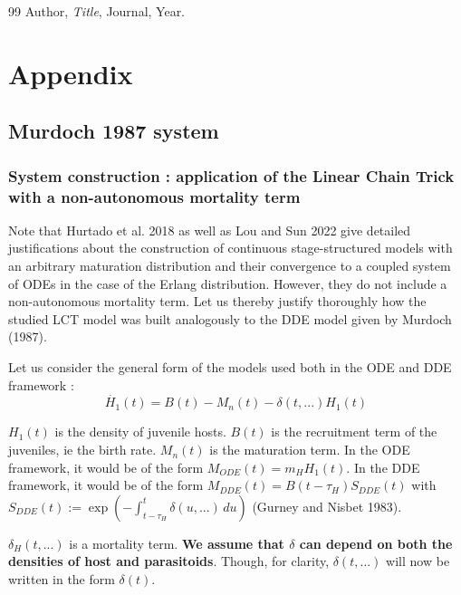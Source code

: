 \documentclass[12pt,a4paper,onecolumn]{article}
\newcommand{\noPageNumber}{\thispagestyle{empty}}
\begin{document}
\newpage
\noPageNumber
\begin{thebibliography}{99}
 Author, \emph{Title}, Journal, Year.
\end{thebibliography}





\newpage
\noPageNumber
\appendix
\section{Appendix}

\subsection{Murdoch 1987 system}
\subsubsection{System construction : application of the Linear Chain Trick with a non-autonomous mortality term}
Note that Hurtado et al. 2018 as well as Lou and Sun 2022 give detailed justifications about the construction of continuous stage-structured models with an arbitrary maturation distribution and their convergence to a coupled system of ODEs in the case of the Erlang distribution. However, they do not include a non-autonomous mortality term. Let us thereby justify thoroughly how the studied LCT model was built analogously to the DDE model given by Murdoch (1987).

Let us consider the general form of the models used both in the ODE and DDE framework :  
\begin{equation}
\dot{H_{1}}(t) = B(t) - M_n(t) - \delta(t, ...) H_1(t)
\end{equation}

$H_1(t)$ is the density of juvenile hosts. $B(t)$ is the recruitment term of the juveniles, ie the birth rate. $M_n(t)$ is the maturation term. In the ODE framework, it would be of the form $M_{ODE}(t)= m_H H_1(t)$. In the DDE framework, it would be of the form $M_{DDE}(t) = B(t-\tau_H)S_{DDE}(t)$ with $S_{DDE}(t) := \exp\left( -\int_{t-\tau_H}^{t} \delta(u, ...) \, du \right)$ (Gurney and Nisbet 1983). 

$\delta_H(t, ...)$ is a mortality term. \textbf{We assume that $\delta$ can depend on both the densities of host and parasitoids}. Though, for clarity, $\delta(t, ...)$ will now be written in the form $\delta(t)$.
\end{document}
